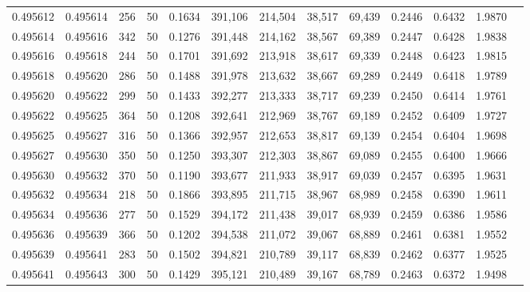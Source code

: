 \begin{tabular}{rrrrrrrrrrrrr}
0.495612 & 0.495614 &   256 &  50 &                                     0.1634 & 391,106 & 214,504 &  38,517 &  69,439 & 0.2446 & 0.6432 & 1.9870 \\
0.495614 & 0.495616 &   342 &  50 &                                     0.1276 & 391,448 & 214,162 &  38,567 &  69,389 & 0.2447 & 0.6428 & 1.9838 \\
0.495616 & 0.495618 &   244 &  50 &                                     0.1701 & 391,692 & 213,918 &  38,617 &  69,339 & 0.2448 & 0.6423 & 1.9815 \\
0.495618 & 0.495620 &   286 &  50 &                                     0.1488 & 391,978 & 213,632 &  38,667 &  69,289 & 0.2449 & 0.6418 & 1.9789 \\
0.495620 & 0.495622 &   299 &  50 &                                     0.1433 & 392,277 & 213,333 &  38,717 &  69,239 & 0.2450 & 0.6414 & 1.9761 \\
0.495622 & 0.495625 &   364 &  50 &                                     0.1208 & 392,641 & 212,969 &  38,767 &  69,189 & 0.2452 & 0.6409 & 1.9727 \\
0.495625 & 0.495627 &   316 &  50 &                                     0.1366 & 392,957 & 212,653 &  38,817 &  69,139 & 0.2454 & 0.6404 & 1.9698 \\
0.495627 & 0.495630 &   350 &  50 &                                     0.1250 & 393,307 & 212,303 &  38,867 &  69,089 & 0.2455 & 0.6400 & 1.9666 \\
0.495630 & 0.495632 &   370 &  50 &                                     0.1190 & 393,677 & 211,933 &  38,917 &  69,039 & 0.2457 & 0.6395 & 1.9631 \\
0.495632 & 0.495634 &   218 &  50 &                                     0.1866 & 393,895 & 211,715 &  38,967 &  68,989 & 0.2458 & 0.6390 & 1.9611 \\
0.495634 & 0.495636 &   277 &  50 &                                     0.1529 & 394,172 & 211,438 &  39,017 &  68,939 & 0.2459 & 0.6386 & 1.9586 \\
0.495636 & 0.495639 &   366 &  50 &                                     0.1202 & 394,538 & 211,072 &  39,067 &  68,889 & 0.2461 & 0.6381 & 1.9552 \\
0.495639 & 0.495641 &   283 &  50 &                                     0.1502 & 394,821 & 210,789 &  39,117 &  68,839 & 0.2462 & 0.6377 & 1.9525 \\
0.495641 & 0.495643 &   300 &  50 &                                     0.1429 & 395,121 & 210,489 &  39,167 &  68,789 & 0.2463 & 0.6372 & 1.9498 \\

\end{tabular}
